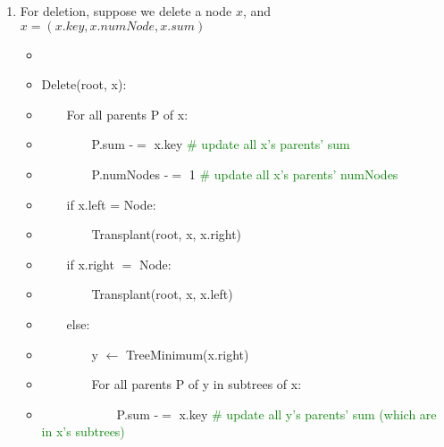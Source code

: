 \documentclass[11pt,twoside]{article}
\begin{document}
\begin{enumerate}[leftmargin=0pt]
\begin{enumerate}
\begin{itemize}  [label={}]
                                 $temp.sum = A.sum$, \ $temp.numNodes = A.numNodes$;\\
                                $A.sum = A.sum - B.sum + E.sum$, \ $A.numNodes = A.numNodes - B.numNodes + E.numNodes$;\\	
                                 $B.sum = B.sum - C.sum + F.sum$, \ $B.numNodes = B.numNodes - C.numNodes + F.numNodes$;\\
                                $C.sum = temp.sum$, \ $C.numNodes = temp.numNodes$.\\
			\end{itemize}
		The right rotation around A is the same.\\
		Therefore, it takes constant time to update all nodes which are changed in the rotation, which means rotation is still in order $\mathcal {O}(1)$. Hence,  worst-case running time is still $\mathcal {O}(log(n))$
		\item For deletion, suppose we delete a node $x$, and $x = (x.key, x.numNode, x.sum)$ 
		\begin{itemize}  [label={}]
			\item
			\item Delete(root, x):
			\item	 \ \ \ \ For all parents P of x:
			\item  \ \ \ \ \ \ \ \ P.sum -$=$ x.key \textcolor{green} {\# update all x's parents' sum}
			\item  \ \ \ \ \ \ \ \ P.numNodes -$=$ 1 \textcolor{green} {\# update all x's parents' numNodes}
			\item \ \ \ \ if x.left = Node:
			\item \ \ \ \ \ \ \ \ Transplant(root, x, x.right)
			\item \ \ \ \ if x.right $=$ Node:
			\item \ \ \ \ \ \ \ \ Transplant(root, x, x.left)	
			\item \ \ \ \ else: 
			\item \ \ \ \ \ \ \ \ y $\leftarrow$ TreeMinimum(x.right)
			\item \ \ \ \ \ \ \ \ For all parents P of y in subtrees of x:
			\item  \ \ \ \ \ \ \ \ \ \ \ \ P.sum -$=$ x.key \textcolor{green} {\# update all y's parents' sum (which are in x's subtrees) }


\end{itemize}
\end{enumerate}
\end{enumerate}
\end{document}
